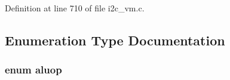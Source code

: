 \-Definition at line 710 of file i2c\-\_\-vm.\-c.



\subsection{\-Enumeration \-Type \-Documentation}
\hypertarget{group___generic_i2_c_sensor_ga2ee1b0064ef2db1498ae8fb59548a865}{
\subsubsection[{aluop}]{\setlength{\rightskip}{0pt plus 5cm}enum {\bf aluop}}}\label{group___generic_i2_c_sensor_ga2ee1b0064ef2db1498ae8fb59548a865}
